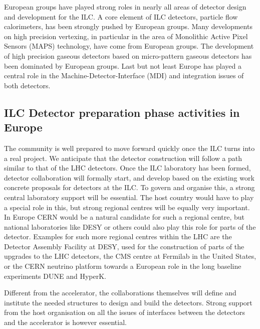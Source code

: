 \documentclass[%
 reprint,
 amsmath,amssymb,
 aps,
]{revtex4-1}
\begin{document}
European groups have played strong roles in nearly all areas of detector design 
and development for the ILC. A core element of ILC detectors, particle flow 
calorimeters, has been strongly pushed by European groups. Many developments on 
high precision vertexing, in particular in the area of Monolithic Active Pixel 
Sensors (MAPS) technology, have come from European groups. The development of 
high precision gaseous detectors based on micro-pattern gaseous detectors has 
been dominated by European groups. Last but not least Europe has played a 
central role in the Machine-Detector-Interface (MDI) and integration issues of 
both detectors.

\subsection{ILC Detector preparation phase activities in Europe~\label{sec:prepphase:detectors}}
The community is well prepared to move forward quickly once the ILC turns into a 
real project. We anticipate that the detector construction will follow a path 
similar to that of the LHC detectors. Once the ILC laboratory has been formed, 
detector collaboration will formally start, and develop based on the existing 
work concrete proposals for detectors at the ILC. To govern and organise this, a 
strong central laboratory support will be essential. The host country would have 
to play a special role in this, but strong regional centres will be equally very 
important. In Europe CERN would be a natural candidate for such a regional 
centre, but national laboratories like DESY or others could also play this role 
for parts of the detector. Examples for such more regional centres within the 
LHC are the Detector Assembly Facility at DESY, used for the construction of 
parts of the upgrades to the LHC detectors, the CMS centre at Fermilab in the 
United States, or the CERN neutrino platform towards a European role in the long 
baseline experiments DUNE and HyperK. 

Different from the accelerator, the collaborations themselves will define and institute 
the needed structures to design and build the detectors. Strong support from the host 
organisation on all the issues of interfaces between the detectors and the accelerator is however essential. 
\end{document}
